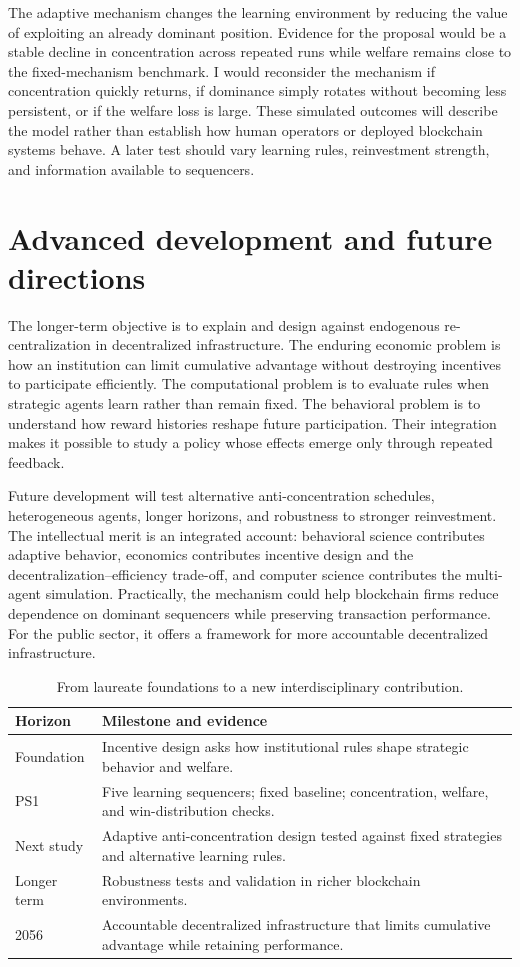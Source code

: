 The adaptive mechanism changes the learning environment by reducing the value of exploiting an already dominant position. Evidence for the proposal would be a stable decline in concentration across repeated runs while welfare remains close to the fixed-mechanism benchmark. I would reconsider the mechanism if concentration quickly returns, if dominance simply rotates without becoming less persistent, or if the welfare loss is large. These simulated outcomes will describe the model rather than establish how human operators or deployed blockchain systems behave. A later test should vary learning rules, reinvestment strength, and information available to sequencers.


\section{Advanced development and future directions}
The longer-term objective is to explain and design against endogenous re-centralization in decentralized infrastructure. The enduring economic problem is how an institution can limit cumulative advantage without destroying incentives to participate efficiently. The computational problem is to evaluate rules when strategic agents learn rather than remain fixed. The behavioral problem is to understand how reward histories reshape future participation. Their integration makes it possible to study a policy whose effects emerge only through repeated feedback.

Future development will test alternative anti-concentration schedules, heterogeneous agents, longer horizons, and robustness to stronger reinvestment. The intellectual merit is an integrated account: behavioral science contributes adaptive behavior, economics contributes incentive design and the decentralization--efficiency trade-off, and computer science contributes the multi-agent simulation. Practically, the mechanism could help blockchain firms reduce dependence on dominant sequencers while preserving transaction performance. For the public sector, it offers a framework for more accountable decentralized infrastructure.

\begin{table}[h]\caption{From laureate foundations to a new interdisciplinary contribution.}
\begin{tabularx}{\columnwidth}{@{}p{1.6cm}Y@{}}\toprule
\textbf{Horizon}&\textbf{Milestone and evidence}\\\midrule
Foundation&Incentive design asks how institutional rules shape strategic behavior and welfare.\\
PS1&Five learning sequencers; fixed baseline; concentration, welfare, and win-distribution checks.\\
Next study&Adaptive anti-concentration design tested against fixed strategies and alternative learning rules.\\
Longer term&Robustness tests and validation in richer blockchain environments.\\
2056&Accountable decentralized infrastructure that limits cumulative advantage while retaining performance.\\\bottomrule
\end{tabularx}\end{table}


